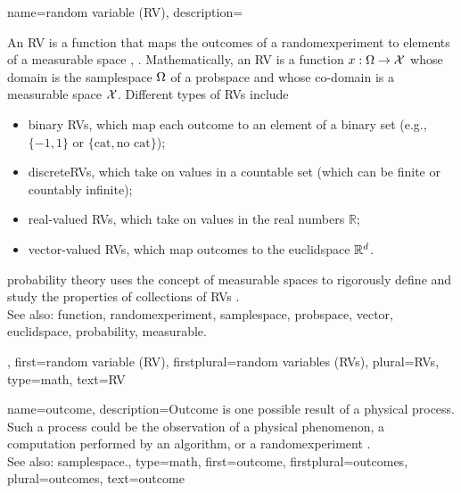 {name={random variable (RV)},
 	description={An RV is a \gls{function} that maps the 
		\glspl{outcome} of a \gls{randomexperiment} to elements of a \gls{measurable} space 
		\cite{BillingsleyProbMeasure}, \cite{GrayProbBook}. 
 		Mathematically, an RV is a \gls{function} $x: \Omega \rightarrow \mathcal{X}$ 
		whose \gls{domain} is the \gls{samplespace} $\Omega$ of a \gls{probspace} and 
		whose \gls{co-domain} is a \gls{measurable} space $\mathcal{X}$. 
 		Different types of RVs include  
 		\begin{itemize} 
 			\item {binary RVs}, which map each \gls{outcome} to an element of a binary 
			set (e.g., $\{-1,1\}$ or $\{\text{cat}, \text{no cat}\}$); 
			\item {\glspl{discreteRV}}, which take on values in a \gls{countable} set (which can 
			be finite or countably infinite); 
 			\item {real-valued RVs}, which take on values in the real numbers $\mathbb{R}$;  
 			\item {\gls{vector}-valued RVs}, which map \glspl{outcome} to the \gls{euclidspace} $\mathbb{R}^{d}$.  
 		\end{itemize} 
 		\Gls{probability} theory uses the concept of \gls{measurable} spaces to rigorously define 
 		and study the properties of collections of RVs \cite{BillingsleyProbMeasure}.
			\\
		See also: \gls{function}, \gls{randomexperiment}, \gls{samplespace}, \gls{probspace}, \gls{vector}, \gls{euclidspace}, \gls{probability}, \gls{measurable}.}, 
	first={random variable (RV)},
	firstplural={random variables (RVs)},
	plural={RVs},
	type=math,
	text={RV}  
}

{name={outcome}, 
  	description={Outcome is one possible result of a physical process.  
		Such a process could be the observation of a physical phenomenon,  
		a computation performed by an \gls{algorithm}, or a \gls{randomexperiment}  
		\cite{BillingsleyProbMeasure}.   
		\\
 		See also: \gls{samplespace}.},  
	type=math, 
  	first={outcome}, 
 	firstplural={outcomes},
 	plural={outcomes},
  	text={outcome}
}

